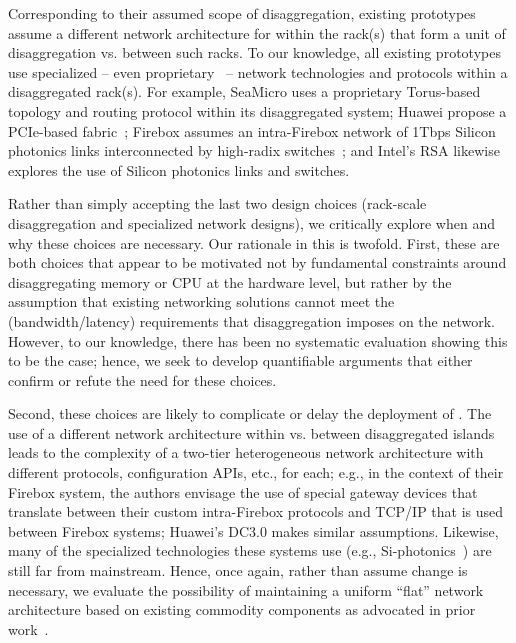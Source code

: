 Corresponding to their assumed scope of disaggregation, existing prototypes assume a different network architecture for within the rack(s) that form a unit of disaggregation vs. between such racks. To our knowledge, all existing \dis prototypes use specialized -- even proprietary~\cite{seamicro,huawei,rsa} -- network technologies and protocols within a disaggregated rack(s). For example, SeaMicro uses a proprietary Torus-based topology and routing protocol within its disaggregated system; Huawei propose a PCIe-based fabric~\cite{huawei1}; Firebox assumes an intra-Firebox network of 1Tbps Silicon photonics links interconnected by high-radix switches~\cite{firebox,vladimir}; and Intel's RSA likewise explores the use of Silicon photonics links and switches. 

Rather than simply accepting the last two design choices (rack-scale disaggregation and specialized network designs), we critically explore when and why these choices are necessary. Our rationale in this is twofold. 
First, these are both choices that appear to be motivated not by fundamental constraints around disaggregating memory or CPU at the hardware level, but rather by the assumption that existing networking solutions cannot meet the (bandwidth/latency) requirements that disaggregation imposes on the network. However, to our knowledge, there has been no systematic evaluation showing this to be the case; hence, we seek to develop quantifiable arguments that either confirm or refute the need for these choices. 

Second, these choices are likely to complicate or delay the deployment of \dis. The use of a different network architecture within vs. between disaggregated islands leads to the complexity of a two-tier heterogeneous network architecture with different protocols, configuration APIs, etc., for each; e.g., in the context of their Firebox system, the authors envisage the use of special gateway devices that translate between their custom intra-Firebox protocols and TCP/IP that is used between Firebox systems; Huawei's DC3.0 makes similar assumptions. Likewise, many of the specialized technologies these systems use (e.g., Si-photonics~\cite{vladimir-nature}) are still far from mainstream. 
Hence, once again, rather than assume change is necessary, we evaluate the possibility of maintaining a uniform ``flat'' network architecture based on existing commodity components as advocated in prior work~\cite{el-fares,vl2,greenberg-costs}. 
%


